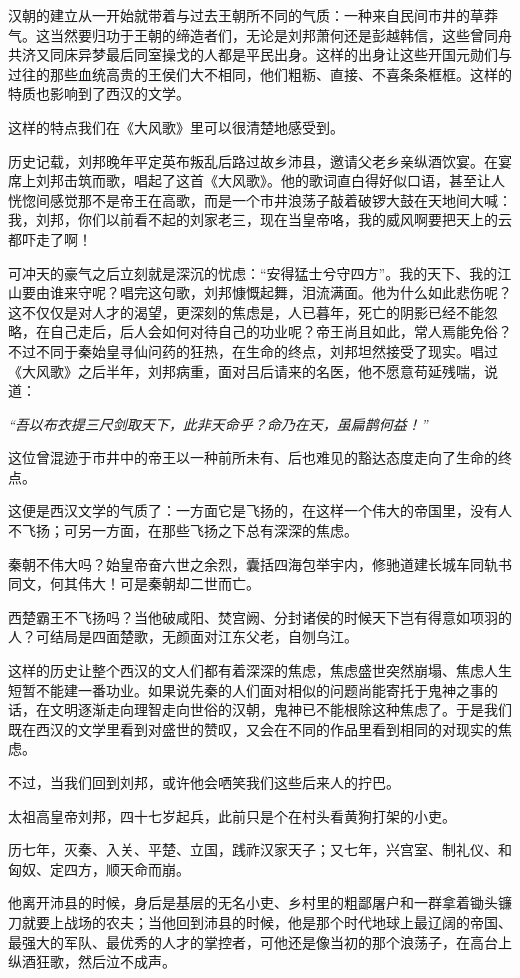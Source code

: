 \begin{appreciation}
汉朝的建立从一开始就带着与过去王朝所不同的气质：一种来自民间市井的草莽气。这当然要归功于王朝的缔造者们，无论是刘邦萧何还是彭越韩信，这些曾同舟共济又同床异梦最后同室操戈的人都是平民出身。这样的出身让这些开国元勋们与过往的那些血统高贵的王侯们大不相同，他们粗粝、直接、不喜条条框框。这样的特质也影响到了西汉的文学。

这样的特点我们在《大风歌》里可以很清楚地感受到。

历史记载，刘邦晚年平定英布叛乱后路过故乡沛县，邀请父老乡亲纵酒饮宴。在宴席上刘邦击筑而歌，唱起了这首《大风歌》。他的歌词直白得好似口语，甚至让人恍惚间感觉那不是帝王在高歌，而是一个市井浪荡子敲着破锣大鼓在天地间大喊：我，刘邦，你们以前看不起的刘家老三，现在当皇帝咯，我的威风啊要把天上的云都吓走了啊！

可冲天的豪气之后立刻就是深沉的忧虑：“安得猛士兮守四方”。我的天下、我的江山要由谁来守呢？唱完这句歌，刘邦慷慨起舞，泪流满面。他为什么如此悲伤呢？这不仅仅是对人才的渴望，更深刻的焦虑是，人已暮年，死亡的阴影已经不能忽略，在自己走后，后人会如何对待自己的功业呢？帝王尚且如此，常人焉能免俗？不过不同于秦始皇寻仙问药的狂热，在生命的终点，刘邦坦然接受了现实。唱过《大风歌》之后半年，刘邦病重，面对吕后请来的名医，他不愿意苟延残喘，说道：

\textit{“吾以布衣提三尺剑取天下，此非天命乎？命乃在天，虽扁鹊何益！”}

这位曾混迹于市井中的帝王以一种前所未有、后也难见的豁达态度走向了生命的终点。

这便是西汉文学的气质了：一方面它是飞扬的，在这样一个伟大的帝国里，没有人不飞扬；可另一方面，在那些飞扬之下总有深深的焦虑。

秦朝不伟大吗？始皇帝奋六世之余烈，囊括四海包举宇内，修驰道建长城车同轨书同文，何其伟大！可是秦朝却二世而亡。

西楚霸王不飞扬吗？当他破咸阳、焚宫阙、分封诸侯的时候天下岂有得意如项羽的人？可结局是四面楚歌，无颜面对江东父老，自刎乌江。

这样的历史让整个西汉的文人们都有着深深的焦虑，焦虑盛世突然崩塌、焦虑人生短暂不能建一番功业。如果说先秦的人们面对相似的问题尚能寄托于鬼神之事的话，在文明逐渐走向理智走向世俗的汉朝，鬼神已不能根除这种焦虑了。于是我们既在西汉的文学里看到对盛世的赞叹，又会在不同的作品里看到相同的对现实的焦虑。

不过，当我们回到刘邦，或许他会哂笑我们这些后来人的拧巴。

太祖高皇帝刘邦，四十七岁起兵，此前只是个在村头看黄狗打架的小吏。

历七年，灭秦、入关、平楚、立国，践祚汉家天子；又七年，兴宫室、制礼仪、和匈奴、定四方，顺天命而崩。

他离开沛县的时候，身后是基层的无名小吏、乡村里的粗鄙屠户和一群拿着锄头镰刀就要上战场的农夫；当他回到沛县的时候，他是那个时代地球上最辽阔的帝国、最强大的军队、最优秀的人才的掌控者，可他还是像当初的那个浪荡子，在高台上纵酒狂歌，然后泣不成声。
\end{appreciation}
